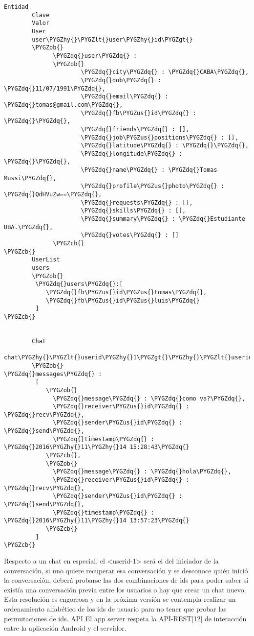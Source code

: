 \documentclass[a4paper,10pt,spanish]{sphinxmanual}
\def\PYGZus{\char`\_}
\def\PYGZob{\char`\{}
\def\PYGZcb{\char`\}}
\def\PYGZlt{\char`\<}
\def\PYGZgt{\char`\>}
\def\PYGZhy{\char`\-}
\def\PYGZdq{\char`\"}
\begin{document}
\begin{Verbatim}[commandchars=\\\{\}]
Entidad
        Clave
        Valor
        User
        user\PYGZhy{}\PYGZlt{}user\PYGZhy{}id\PYGZgt{}
        \PYGZob{}
              \PYGZdq{}user\PYGZdq{} :
              \PYGZob{}
                      \PYGZdq{}city\PYGZdq{} : \PYGZdq{}CABA\PYGZdq{},
                      \PYGZdq{}dob\PYGZdq{} : \PYGZdq{}11/07/1991\PYGZdq{},
                      \PYGZdq{}email\PYGZdq{} : \PYGZdq{}tomas@gmail.com\PYGZdq{},
                      \PYGZdq{}fb\PYGZus{}id\PYGZdq{} : \PYGZdq{}\PYGZdq{},
                      \PYGZdq{}friends\PYGZdq{} : [],
                      \PYGZdq{}job\PYGZus{}positions\PYGZdq{} : [],
                      \PYGZdq{}latitude\PYGZdq{} : \PYGZdq{}\PYGZdq{},
                      \PYGZdq{}longitude\PYGZdq{} : \PYGZdq{}\PYGZdq{},
                      \PYGZdq{}name\PYGZdq{} : \PYGZdq{}Tomas Mussi\PYGZdq{},
                      \PYGZdq{}profile\PYGZus{}photo\PYGZdq{} : \PYGZdq{}QdHVuZw==\PYGZdq{},
                      \PYGZdq{}requests\PYGZdq{} : [],
                      \PYGZdq{}skills\PYGZdq{} : [],
                      \PYGZdq{}summary\PYGZdq{} : \PYGZdq{}Estudiante UBA.\PYGZdq{},
                      \PYGZdq{}votes\PYGZdq{} : []
              \PYGZcb{}
\PYGZcb{}
        UserList
        users
        \PYGZob{}
         \PYGZdq{}users\PYGZdq{}:[
            \PYGZdq{}fb\PYGZus{}id\PYGZus{}tomas\PYGZdq{},
            \PYGZdq{}fb\PYGZus{}id\PYGZus{}luis\PYGZdq{}
         ]
\PYGZcb{}


        Chat
        chat\PYGZhy{}\PYGZlt{}userid\PYGZhy{}1\PYGZgt{}\PYGZhy{}\PYGZlt{}userid2\PYGZgt{}
        \PYGZob{}
\PYGZdq{}messages\PYGZdq{} :
         [
            \PYGZob{}
              \PYGZdq{}message\PYGZdq{} : \PYGZdq{}como va?\PYGZdq{},
              \PYGZdq{}receiver\PYGZus{}id\PYGZdq{} : \PYGZdq{}recv\PYGZdq{},
              \PYGZdq{}sender\PYGZus{}id\PYGZdq{} : \PYGZdq{}send\PYGZdq{},
              \PYGZdq{}timestamp\PYGZdq{} : \PYGZdq{}2016\PYGZhy{}11\PYGZhy{}14 15:28:43\PYGZdq{}
            \PYGZcb{},
            \PYGZob{}
              \PYGZdq{}message\PYGZdq{} : \PYGZdq{}hola\PYGZdq{},
              \PYGZdq{}receiver\PYGZus{}id\PYGZdq{} : \PYGZdq{}recv\PYGZdq{},
              \PYGZdq{}sender\PYGZus{}id\PYGZdq{} : \PYGZdq{}send\PYGZdq{},
              \PYGZdq{}timestamp\PYGZdq{} : \PYGZdq{}2016\PYGZhy{}11\PYGZhy{}14 13:57:23\PYGZdq{}
            \PYGZcb{}
         ]
\PYGZcb{}
\end{Verbatim}

Respecto a un chat en especial, el \textless{}userid-1\textgreater{} será el del iniciador de la conversación, si uno quiere recuperar esa conversación y se desconoce quién inició la conversación, deberá probarse las dos combinaciones de ids para poder saber si existía una conversación previa entre los usuarios o hay que crear un chat nuevo. Esta resolución es engorrosa y en la próxima versión se contempla realizar un ordenamiento alfabético de los ids de usuario para no tener que probar las permutaciones de ids.
API
El app server respeta la API-REST{[}12{]} de interacción entre la aplicación Android y el servidor.
\end{document}
